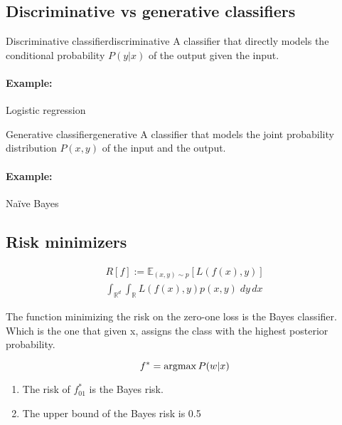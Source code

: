 \subsection{Discriminative vs generative classifiers}

\begin{definition}{Discriminative classifier}{discriminative}
	A classifier that directly models the conditional probability
	\(P(y | x)\) of the output given the input.

	\paragraph{Example:} Logistic regression
\end{definition}

\begin{definition}{Generative classifier}{generative}
	A classifier that models the joint probability distribution
	\(P(x, y)\) of the input and the output.

	\paragraph{Example:} Naïve Bayes
\end{definition}

\subsection{Risk minimizers}

\begin{align*}
	R[f] := \mathds{E}_{(x, y) \sim p} [ L(f(x), y) ] \\
	\int_{\mathds{R}^d} \int_{\mathds{R}} L(f(x), y) p(x, y)\; dy\, dx
\end{align*}

\begin{prop}{}{}

	The function minimizing the risk on the zero-one loss is the Bayes
	classifier. Which is the one that given x, assigns the class with the
	highest posterior probability.

	\[f^* = \operatorname{argmax} {P(w | x)}\]

	\begin{enumerate}
		\item The risk of \(f_{01}^*\) is the Bayes risk.
		\item The upper bound of the Bayes risk is 0.5
	\end{enumerate}

\end{prop}

